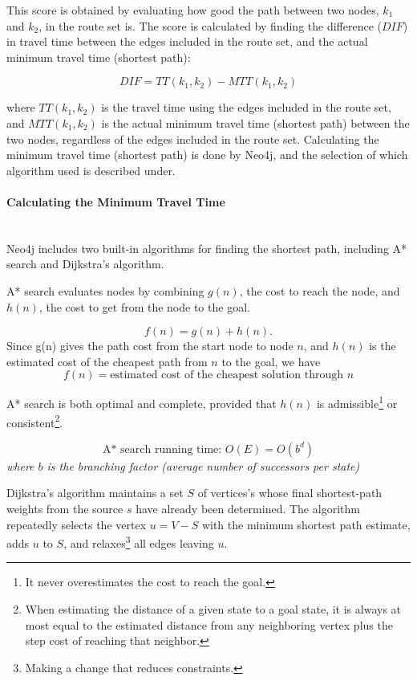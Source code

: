 This score is obtained by evaluating how good the path between two nodes, $k_1$ and $k_2$, in the route set is. The score is calculated by finding the difference ($DIF$) in travel time between the edges included in the route set, and the actual minimum travel time (shortest path):

$$ DIF = TT(k_{1},k_{2}) - MTT(k_{1},k_{2})$$

where $ TT(k_{1},k_{2})$ is the travel time using the edges included in the route set, and $ MTT(k_{1},k_{2})$ is the actual minimum travel time (shortest path) between the two nodes, regardless of the edges included in the route set. Calculating the minimum travel time (shortest path) is done by Neo4j, and the selection of which algorithm used is described under.

\paragraph{Calculating the Minimum Travel Time}\mbox{}\\ 

Neo4j includes two built-in algorithms for finding the shortest path, including A* search\citep{russel10}  and Dijkstra's algorithm\citep{cormen09}. 

A* search\cite[p.93-94]{russel10} evaluates nodes by combining $g(n)$, the cost to reach the node, and $h(n)$, the cost to get from the node to the goal.

$$ f(n) = g(n) + h(n).$$
Since g(n) gives the path cost from the start node to node $n$, and $h(n)$ is the estimated cost of the cheapest path from $n$ to the goal, we have
$$f(n) = \text{estimated cost of the cheapest solution through $n$} $$ 

A* search is both optimal and complete, provided that $h(n)$ is admissible\footnote{It never overestimates the cost to reach the goal.} or consistent\footnote{When estimating the distance of a given state to a goal state, it is always at most equal to the estimated distance from any neighboring vertex plus the step cost of reaching that neighbor.}. 

$$ \text{A* search running time: } O(E) = O(b^d)$$
\textit{where $b$ is the branching factor (average number of successors per state)}

Dijkstra's algorithm \cite[p.658-662]{cormen09} maintains a set $S$ of vertices's whose final shortest-path weights from the source $s$ have already been determined. The algorithm repeatedly selects the vertex $u = V - S$ with the minimum shortest path estimate, adds $u$ to $S$, and relaxes\footnote{Making a change that reduces constraints.} all edges leaving $u$.

